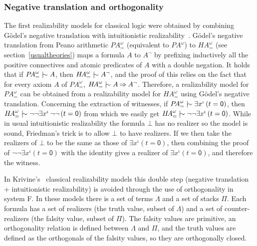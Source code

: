 \documentclass{CSML}
\newcommand*\Derives{\mathrel{|\mkern-8.75mu\sim}}
\newcommand*\LogSortedTerm[2]{#1^{#2}}
\newcommand*\LogTermA{t}
\newcommand*\LogVarA{x}
\newcommand*\LogConst[1]{\mathsf{#1}}
\newcommand*\LogImp{\mathbin{\Rightarrow}}
\newcommand*\LogBot\bot
\newcommand*\LogFormA{A}
\newcommand*\HA{{H\!A}}
\newcommand*\PA{{P\!A}}
\newcommand*\PAom{{\PA^\omega}}
\newcommand*\CASort\iota
\newcommand*\CALogZ{\LogConst{0}}
\begin{document}
\subsubsection{Negative translation and orthogonality}
\label{NegTrans}
The first realizability models for classical logic were obtained by combining G\"odel's negative translation with intuitionistic realizability~\cite{BerardiBezemCoquand,BergerOlivaChoice,KohlenbachProofTheory}. G\"odel's negative translation from Peano arithmetic $\PA^\omega_=$ (equivalent to $\PAom$) to $\HA^\omega_=$ (see section~\ref{usualtheories}) maps a formula $\LogFormA$ to $\LogFormA^\neg$ by prefixing inductively all the positive connectives and atomic predicates of $\LogFormA$ with a double negation. It holds that if $\PA^\omega_=\Derives\LogFormA$, then $\HA^\omega_=\Derives\LogFormA^\neg$, and the proof of this relies on the fact that for every axiom $\LogFormA$ of $\PA^\omega_=$, $\HA^\omega_=\Derives\LogFormA\LogImp\LogFormA^\neg$. Therefore, a realizability model for $\PA^\omega_=$ can be obtained from a realizability model for $\HA^\omega_=$ using G\"odel's negative translation. Concerning the extraction of witnesses, if $\PA^\omega_=\Derives\exists\LogSortedTerm{\LogVarA}{\CASort}\left(\LogTermA=\CALogZ\right)$, then $\HA^\omega_=\Derives\neg\neg\exists\LogSortedTerm{\LogVarA}{\CASort}\,\neg\neg\left(\LogTermA=\CALogZ\right)$ from which we easily get $\HA^\omega_=\Derives\neg\neg\exists\LogSortedTerm{\LogVarA}{\CASort}\left(\LogTermA=\CALogZ\right)$. While in usual intuitionistic realizability the formula $\LogBot$ has no realizer so the model is sound, Friedman's trick is to allow $\LogBot$ to have realizers. If we then take the realizers of $\LogBot$ to be the same as those of $\exists\LogSortedTerm{\LogVarA}{\CASort}\left(\LogTermA=\CALogZ\right)$, then combining the proof of $\neg\neg\exists\LogSortedTerm{\LogVarA}{\CASort}\left(\LogTermA=\CALogZ\right)$ with the identity gives a realizer of $\exists\LogSortedTerm{\LogVarA}{\CASort}\left(\LogTermA=\CALogZ\right)$, and therefore the witness.\par
In Krivine's~\cite{KrivinePanoramas} classical realizability models this double step (negative translation + intuitionistic realizability) is avoided through the use of orthogonality in system F. In these models there is a set of terms $\Lambda$ and a set of stacks $\Pi$. Each formula has a set of realizers (the truth value, subset of $\Lambda$) and a set of counter-realizers (the falsity value, subset of $\Pi$). The falsity values are primitive, an orthogonality relation is defined between $\Lambda$ and $\Pi$, and the truth values are defined as the orthogonals of the falsity values, so they are orthogonally closed.\par
\end{document}

